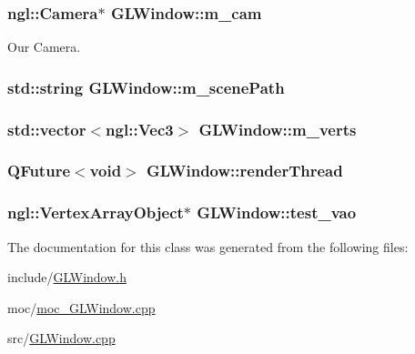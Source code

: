 \subsubsection[{m\+\_\+cam}]{\setlength{\rightskip}{0pt plus 5cm}ngl\+::\+Camera$\ast$ G\+L\+Window\+::m\+\_\+cam}\label{classGLWindow_a55556dafb4fc86c35b270ca0d68f456e}


Our Camera. 

\hypertarget{classGLWindow_a5175cc7e618636fc7e3d6f8eb3e0dc39}{}
\subsubsection[{m\+\_\+scene\+Path}]{\setlength{\rightskip}{0pt plus 5cm}std\+::string G\+L\+Window\+::m\+\_\+scene\+Path}\label{classGLWindow_a5175cc7e618636fc7e3d6f8eb3e0dc39}
\hypertarget{classGLWindow_aac22ba5ee4eeec173f668f8cdf40fc76}{}
\subsubsection[{m\+\_\+verts}]{\setlength{\rightskip}{0pt plus 5cm}std\+::vector$<$ngl\+::\+Vec3$>$ G\+L\+Window\+::m\+\_\+verts}\label{classGLWindow_aac22ba5ee4eeec173f668f8cdf40fc76}
\hypertarget{classGLWindow_af84acb17ea1b3a5dde7abc9c85771447}{}
\subsubsection[{render\+Thread}]{\setlength{\rightskip}{0pt plus 5cm}Q\+Future$<$void$>$ G\+L\+Window\+::render\+Thread}\label{classGLWindow_af84acb17ea1b3a5dde7abc9c85771447}
\hypertarget{classGLWindow_a90e0680c5b0aa5b2abdb2ddc4a82157e}{}
\subsubsection[{test\+\_\+vao}]{\setlength{\rightskip}{0pt plus 5cm}ngl\+::\+Vertex\+Array\+Object$\ast$ G\+L\+Window\+::test\+\_\+vao}\label{classGLWindow_a90e0680c5b0aa5b2abdb2ddc4a82157e}


The documentation for this class was generated from the following files\+:\begin{DoxyCompactItemize}
\item 
include/\hyperlink{GLWindow_8h}{G\+L\+Window.\+h}\item 
moc/\hyperlink{moc__GLWindow_8cpp}{moc\+\_\+\+G\+L\+Window.\+cpp}\item 
src/\hyperlink{GLWindow_8cpp}{G\+L\+Window.\+cpp}\end{DoxyCompactItemize}
